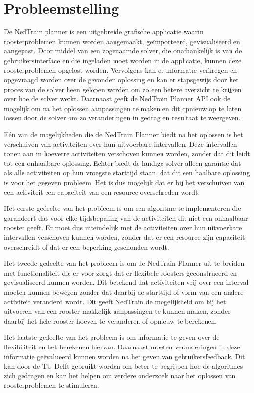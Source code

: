 \section{Probleemstelling}
\label{sec:probleemstelling}

De NedTrain planner is een uitgebreide grafische applicatie waarin roosterproblemen kunnen worden aangemaakt, ge\"importeerd, gevisualiseerd en aangepast. Door middel van een zogenaamde solver, die onafhankelijk is van de gebruikersinterface en die ingeladen moet worden in de applicatie, kunnen deze roosterproblemen opgelost worden. Vervolgens kan er informatie verkregen en opgevraagd worden over de gevonden oplossing en kan er stapsgewijs door het proces van de solver heen gelopen worden om zo een betere overzicht te krijgen over hoe de solver werkt. Daarnaast geeft de NedTrain Planner API ook de mogelijk om na het oplossen aanpassingen te maken en dit opnieuw op te laten lossen door de solver om zo veranderingen in gedrag en resultaat te weergeven.

E\'en van de mogelijkheden die de NedTrain Planner biedt na het oplossen is het verschuiven van activiteiten over hun uitvoerbare intervallen. Deze intervallen tonen aan in hoeverre activiteiten verschoven kunnen worden, zonder dat dit leidt tot een onhaalbare oplossing. Echter biedt de huidige solver alleen garantie dat als alle activiteiten op hun vroegste starttijd staan, dat dit een haalbare oplossing is voor het gegeven probleem. Het is dus mogelijk dat er bij het verschuiven van een activiteit een capaciteit van een resource overschreden wordt.

Het eerste gedeelte van het probleem is om een algoritme te implementeren die garandeert dat voor elke tijdsbepaling van de activiteiten dit niet een onhaalbaar rooster geeft. Er moet dus uiteindelijk met de activiteiten over hun uitvoerbare intervallen verschoven kunnen worden, zonder dat er een resource zijn capaciteit overschreidt of dat er een beperking geschonden wordt.

Het tweede gedeelte van het probleem is om de NedTrain Planner uit te breiden met functionaliteit die er voor zorgt dat er flexibele roosters geconstrueerd en gevisualiseerd kunnen worden. Dit betekend dat activiteiten vrij over een interval moeten kunnen bewegen zonder dat daarbij de starttijd of vorm van een andere activiteit veranderd wordt. Dit geeft NedTrain de mogelijkheid om bij het uitvoeren van een rooster makkelijk aanpassingen te kunnen maken, zonder daarbij het hele rooster hoeven te veranderen of opnieuw te berekenen.

Het laatste gedeelte van het probleem is om informatie te geven over de flexibiliteit en het berekenen hiervan. Daarnaast moeten veranderingen in deze informatie ge\"evalueerd kunnen worden na het geven van gebruikersfeedback. Dit kan door de TU Delft gebruikt worden om beter te begrijpen hoe de algoritmes zich gedragen en kan het helpen om verdere onderzoek naar het oplossen van roosterproblemen te stimuleren.



